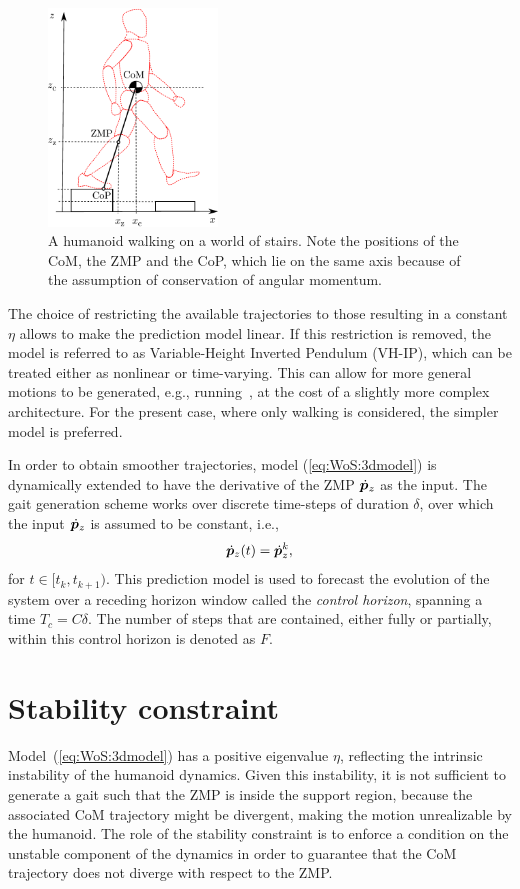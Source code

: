 \begin{figure}
    \centering
    \includegraphics[width=0.4\textwidth]{figures/LIPM_robot.pdf}
    \caption{A humanoid walking on a world of stairs. Note the positions of the CoM, the ZMP and the CoP, which lie on the same axis because of the assumption of conservation of angular momentum.}
    \label{fig:ISMPC:LIPM-robot}
\end{figure}

The choice of restricting the available trajectories to those resulting in a constant $\eta$ allows to make the prediction model linear. If this restriction is removed, the model is referred to as Variable-Height Inverted Pendulum (VH-IP), which can be treated either as nonlinear or time-varying. This can allow for more general motions to be generated, e.g., running~\cite{Smaldone2022Running}, at the cost of a slightly more complex architecture. For the present case, where only walking is considered, the simpler model is preferred.

In order to obtain smoother trajectories, model (\ref{eq:WoS:3dmodel}) is dynamically extended to have the derivative of the ZMP $\dot {{\bm{p}}}_z$ as the input.
The gait generation scheme works over discrete time-steps of duration $\delta$, over which the input $\dot {{\bm{p}}}_z$ is assumed to be constant, i.e.,
\begin{equation*}
    \dot {{\bm{p}}}_z(t) = \dot {{\bm{p}}}_z^k,
\end{equation*}
for $t\in[t_k, t_{k+1})$. This prediction model is used to forecast the evolution of the system over a receding horizon window called the \emph{control horizon}, spanning a time $T_c=C\delta$. The number of steps that are contained, either fully or partially, within this control horizon is denoted as $F$.

\section{Stability constraint}
Model~(\ref{eq:WoS:3dmodel}) has a positive eigenvalue $\eta$, reflecting the intrinsic instability of the humanoid dynamics. Given this instability, it is not sufficient to generate a gait such that the ZMP is inside the support region, because the associated CoM trajectory might be divergent, making the motion unrealizable by the humanoid.
The role of the stability constraint is to enforce a condition on the unstable component of the dynamics in order to guarantee that the CoM trajectory does not diverge with respect to the ZMP.

